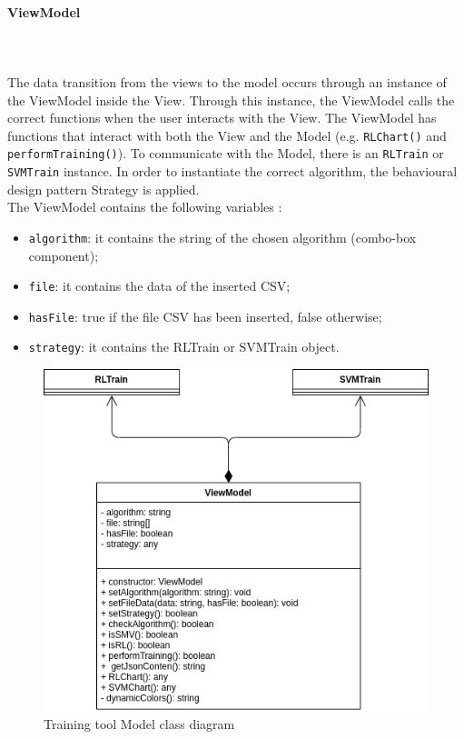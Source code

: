 \paragraph{ViewModel}\mbox{} \\ \mbox{} \\
The data transition from the views to the model occurs through an instance of the ViewModel inside the View. Through this instance, the ViewModel calls the correct functions when the user interacts with the View.
The ViewModel has functions that interact with both the View and the Model (e.g. \texttt{RLChart()} and \texttt{performTraining()}).
To communicate with the Model, there is an \texttt{RLTrain} or \texttt{SVMTrain} instance. In order to instantiate the correct algorithm, the behavioural design pattern Strategy is applied. \\
The ViewModel contains the following variables	: \begin{itemize}
\item \texttt{algorithm}: it contains the string of the chosen algorithm (combo-box component);
\item \texttt{file}: it contains the data of the inserted CSV;
\item \texttt{hasFile}: true if the file CSV has been inserted, false otherwise;
\item \texttt{strategy}: it contains the RLTrain or SVMTrain object.
\end{itemize}

\begin{figure}[H]
\centering
\includegraphics[scale=0.6]{../../../Diagrams/Classes_diagrams/tool_modelview.png}
\caption{Training tool Model class diagram}
\end{figure}

